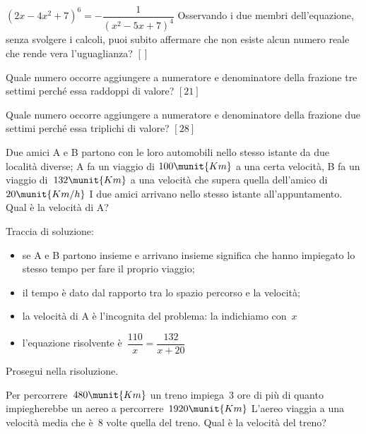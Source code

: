 \begin{esercizio}
\label{ese:20.29}
\(\left(2x-4x^{2}+7\right)^{6}=-{\dfrac{1}{\left(x^{2}-5x+7\right)^{4}}}\) 
Osservando i due membri dell'equazione, senza svolgere i calcoli, puoi subito 
affermare che non esiste alcun numero reale che rende vera l'uguaglianza?
  \hfill \(\left[\right]\)
\end{esercizio}

\begin{esercizio}[*]
\label{ese:20.30}
Quale numero occorre aggiungere a numeratore e denominatore della frazione 
tre settimi perché essa raddoppi di valore?
  \hfill \(\left[21\right]\)
\end{esercizio}

\begin{esercizio}[*]
\label{ese:20.31}
Quale numero occorre aggiungere a numeratore e denominatore della frazione 
due settimi perché essa triplichi di valore?
  \hfill \(\left[28\right]\)
\end{esercizio}

\begin{esercizio}
\label{ese:20.32}
Due amici A e B partono con le loro automobili nello stesso istante da due 
località diverse; A fa un viaggio di \(100\munit{Km}\) a una certa velocità, 
B fa un viaggio di~\(132\munit{Km}\) a una velocità che supera quella 
dell'amico 
di~\(20\munit{Km/h}\)
I due amici arrivano nello stesso istante all'appuntamento. 
Qual è la velocità di A?
\begin{center}
 
\end{center}
Traccia di soluzione:
\begin{itemize}
 \item se A e B partono insieme e arrivano insieme significa che hanno 
 impiegato lo stesso tempo per fare il proprio viaggio;
 \item il tempo è dato dal rapporto tra lo spazio percorso e la velocità;
 \item la velocità di A è l'incognita del problema: la indichiamo con~\(x\)
 \item l'equazione risolvente è~\(\dfrac{110}{x}=\dfrac{132}{x+20}\)
\end{itemize}
Prosegui nella risoluzione.
\end{esercizio}

\begin{esercizio}
\label{ese:20.33}
Per percorrere~\(480\munit{Km}\) un treno impiega~\(3\) ore di più di quanto 
impiegherebbe un aereo a percorrere~\(1920\munit{Km}\)
L'aereo viaggia a una velocità media che è~\(8\) volte quella del treno. 
Qual è la velocità del treno?
\end{esercizio}

